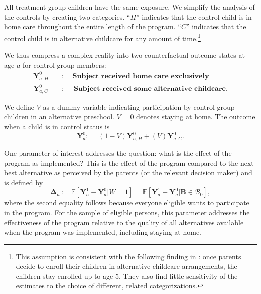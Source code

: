 All treatment group children have the same exposure. We simplify the analysis of the controls by creating two categories. ``$H$'' indicates that the control child is in home care throughout the entire length of the program. ``$C$'' indicates that the control child is in alternative childcare for any amount of time.\footnote{This assumption is consistent with the following finding in \cite{Garcia_Ziff_2017_Gender-Diff_UNPUBLISHED}: once parents decide to enroll their children in alternative childcare arrangements, the children stay enrolled up to age 5. They also find little sensitivity of the estimates to the choice of different, related categorizations.}  

We thus compress a complex reality into two counterfactual outcome states at age $a$ for control group members:
\begin{align*}
\bm{Y}_{a,H}^0 \quad &: \quad \textbf{ Subject received home care exclusively} \\
\bm{Y}_{a,C}^0 \quad &: \quad \textbf{ Subject received some alternative childcare}.
\end{align*}

We define $V$ as a dummy variable indicating participation by control-group children in an alternative preschool. $V=0$ denotes staying at home. The outcome when a child is in control status is
\begin{equation}
\bm{Y}^0_a : = \left( 1 - V \right) \bm{Y}^0_{a,H} + \left( V \right) \bm{Y}^0_{a,C}. \label{eq:meandiff}
\end{equation}

One parameter of interest addresses the question: what is the effect of the program as implemented? This is the effect of the program compared to the next best alternative as perceived by the parents (or the relevant decision maker) and is defined by
\begin{equation}\label{eq:effect}
\bm{\Delta}_a := \mathbb{E} \left[ \bm{Y}^1_a -  \bm{Y}^0_a | W =1 \right] = \mathbb{E} \left[\bm{Y}^1_a - \bm{Y}^0_a | \bm{B} \in \mathcal{B}_0 \right],
\end{equation}
where the second equality follows because everyone eligible wants to participate in the program. For the sample of eligible persons, this parameter addresses the effectiveness of the program relative to the quality of all alternatives available when the program was implemented, including staying at home.


